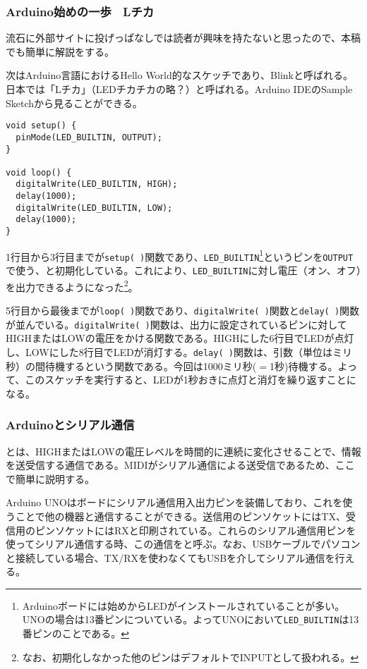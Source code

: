 \documentclass[uplatex, 10pt, dvipdfmx]{jsarticle}
\numberwithin{equation}{section}
\newcommand{\emphj}[1]{\textbf{\textrm{\textgt{{#1}}}}}
\begin{document}
\subsubsection{Arduino始めの一歩　Lチカ}
流石に外部サイトに投げっぱなしでは読者が興味を持たないと思ったので、本稿でも簡単に解説をする。

次はArduino言語におけるHello World的なスケッチであり、Blinkと呼ばれる。日本では「Lチカ」（LEDチカチカの略？）と呼ばれる。Arduino IDEのSample Sketchから見ることができる。
\begin{lstlisting}[caption=Lチカ]
void setup() {
  pinMode(LED_BUILTIN, OUTPUT);
}

void loop() {
  digitalWrite(LED_BUILTIN, HIGH);
  delay(1000);
  digitalWrite(LED_BUILTIN, LOW);
  delay(1000);
}
\end{lstlisting}

1行目から3行目までが\verb|setup( )|関数であり、\verb|LED_BUILTIN|\footnote{Arduinoボードには始めからLEDがインストールされていることが多い。UNOの場合は13番ピンについている。よってUNOにおいて\verb|LED_BUILTIN|は13番ピンのことである。}というピンを\verb|OUTPUT|で使う、と初期化している。これにより、\verb|LED_BUILTIN|に対し電圧（オン、オフ）を出力できるようになった\footnote{なお、初期化しなかった他のピンはデフォルトでINPUTとして扱われる。}。

5行目から最後までが\verb|loop( )|関数であり、\verb|digitalWrite( )|関数と\verb|delay( )|関数が並んでいる。\verb|digitalWrite( )|関数は、出力に設定されているピンに対してHIGHまたはLOWの電圧をかける関数である。HIGHにした6行目でLEDが点灯し、LOWにした8行目でLEDが消灯する。\verb|delay( )|関数は、引数（単位はミリ秒）の間待機するという関数である。今回は1000ミリ秒($=$1秒)待機する。よって、このスケッチを実行すると、LEDが1秒おきに点灯と消灯を繰り返すことになる。

\subsubsection{Arduinoとシリアル通信}
\emphj{シリアル通信}とは、HIGHまたはLOWの電圧レベルを時間的に連続に変化させることで、情報を送受信する通信である。MIDIがシリアル通信による送受信であるため、ここで簡単に説明する。

Arduino UNOはボードにシリアル通信用入出力ピンを装備しており、これを使うことで他の機器と通信することができる。送信用のピンソケットにはTX、受信用のピンソケットにはRXと印刷されている。これらのシリアル通信用ピンを使ってシリアル通信する時、この通信を\emphj{HardwareSerial}と呼ぶ。なお、USBケーブルでパソコンと接続している場合、TX/RXを使わなくてもUSBを介してシリアル通信を行える。
\end{document}
